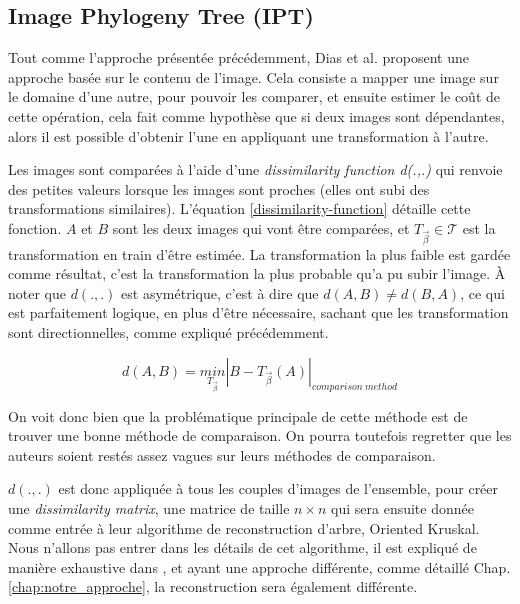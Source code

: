 \documentclass[utf8]{stageM2R} %
\begin{document}
\subsection{Image Phylogeny Tree (IPT)}

Tout comme l'approche présentée précédemment, Dias et al. \cite{dias2010first}\cite{dias2012image} proposent une approche basée sur le contenu de l'image. Cela consiste a mapper une image sur le domaine d'une autre, pour pouvoir les comparer, et ensuite estimer le coût de cette opération, cela fait comme hypothèse que si deux images sont dépendantes, alors il est possible d'obtenir l'une en appliquant une transformation à l'autre. 

Les images sont comparées à l'aide d'une \textit{dissimilarity function d(.,.)} qui renvoie des petites valeurs lorsque les images sont proches (elles ont subi des transformations similaires). L'équation \ref{dissimilarity-function} détaille cette fonction. $A$ et $B$ sont les deux images qui vont être comparées, et $T_{\overrightarrow{\beta}} \in \mathcal{T}$ est la transformation en train d'être estimée. La transformation la plus faible est gardée comme résultat, c'est la transformation la plus probable qu'a pu subir l'image. À noter que $d(.,.)$ est asymétrique, c'est à dire que $d(A,B) \neq d(B,A)$, ce qui est parfaitement logique, en plus d'être nécessaire, sachant que les transformation sont directionnelles, comme expliqué précédemment.

\begin{equation}
  d(A,B) = \underset{T_{\overrightarrow{\beta}}}{min}\left | B - T_{\overrightarrow{\beta}}(A) \right |_{comparison\ method}
  \label{dissimilarity-function}
\end{equation}

On voit donc bien que la problématique principale de cette méthode est de trouver une bonne méthode de comparaison. On pourra toutefois regretter que les auteurs soient restés assez vagues sur leurs méthodes de comparaison.

\vspace{3mm}

$d(.,.)$ est donc appliquée à tous les couples d'images de l'ensemble, pour créer une \textit{dissimilarity matrix}, une matrice de taille $n\times n$ qui sera ensuite donnée comme entrée à leur algorithme de reconstruction d'arbre, Oriented Kruskal. Nous n'allons pas entrer dans les détails de cet algorithme, il est expliqué de manière exhaustive dans \cite{dias2012image}, et ayant une approche différente, comme détaillé Chap. \ref{chap:notre_approche}, la reconstruction sera également différente.
\end{document}
